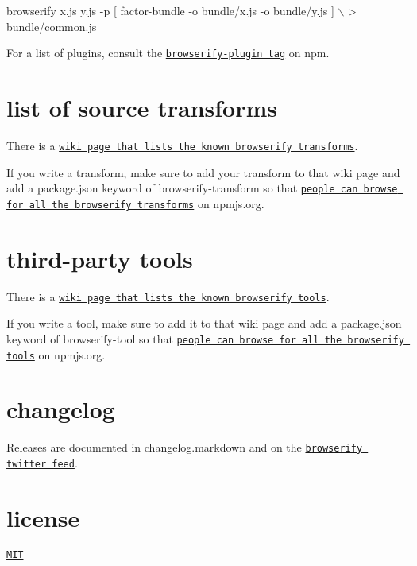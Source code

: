 \begin{DoxyCode}
browserify x.js y.js -p [ factor-bundle -o bundle/x.js -o bundle/y.js ] \(\backslash\)
  > bundle/common.js
\end{DoxyCode}


For a list of plugins, consult the \href{https://www.npmjs.com/browse/keyword/browserify-plugin}{\tt browserify-\/plugin tag} on npm.

\section*{list of source transforms}

There is a \href{https://github.com/browserify/browserify/wiki/list-of-transforms}{\tt wiki page that lists the known browserify transforms}.

If you write a transform, make sure to add your transform to that wiki page and add a package.\+json keyword of {\ttfamily browserify-\/transform} so that \href{https://www.npmjs.com/browse/keyword/browserify-transform}{\tt people can browse for all the browserify transforms} on npmjs.\+org.

\section*{third-\/party tools}

There is a \href{https://github.com/browserify/browserify/wiki/browserify-tools}{\tt wiki page that lists the known browserify tools}.

If you write a tool, make sure to add it to that wiki page and add a package.\+json keyword of {\ttfamily browserify-\/tool} so that \href{https://www.npmjs.com/browse/keyword/browserify-tool}{\tt people can browse for all the browserify tools} on npmjs.\+org.

\section*{changelog}

Releases are documented in changelog.markdown and on the \href{https://twitter.com/browserify}{\tt browserify twitter feed}.

\section*{license}

\href{./LICENSE}{\tt M\+IT}

 
